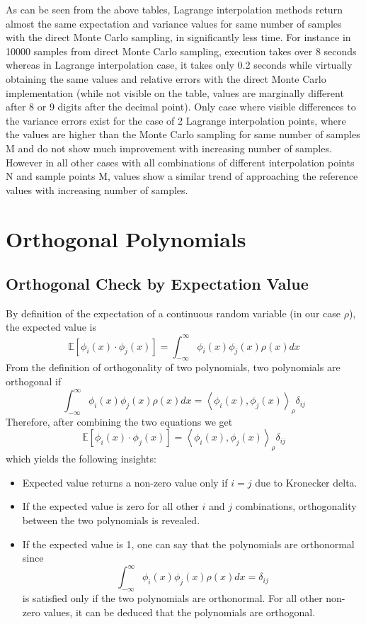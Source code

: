 \documentclass{article}
\begin{document}
As can be seen from the above tables, Lagrange interpolation methods return almost the same expectation and variance 
values for same number of samples with the direct Monte Carlo sampling, in significantly less time. For instance 
in 10000 samples from direct Monte Carlo sampling, execution takes over 8 seconds whereas in Lagrange interpolation 
case, it takes only 0.2 seconds while virtually obtaining the same values and relative errors with the direct Monte
Carlo implementation (while not visible on the table, values are marginally different after 8 or 9 digits after
the decimal point). Only case where visible differences to the variance errors exist for the case of 2 Lagrange 
interpolation points, where the values are higher than the Monte Carlo sampling for same number of samples M and 
do not show much improvement with increasing number of samples. However in all other cases with all combinations
of different interpolation points N and sample points M, values show a similar trend of approaching the reference 
values with increasing number of samples.

\section{Orthogonal Polynomials}
\subsection{Orthogonal Check by Expectation Value}
By definition of the expectation of a continuous random variable (in our case $\rho$), the expected value is 
\begin{equation}
    \mathbb{E}[\phi_i(x)\cdot\phi_j(x)] = \int_{-\infty}^\infty\phi_i(x)\phi_j(x)\rho(x)dx
\end{equation}
From the definition of orthogonality of two polynomials, two polynomials are orthogonal if 
\begin{equation}
    \int_{-\infty}^\infty\phi_i(x)\phi_j(x)\rho(x)dx = \left\langle\phi_i(x), \phi_j(x)\right\rangle _\rho\delta_{ij}
\end{equation}
Therefore, after combining the two equations we get 
\begin{equation}
    \mathbb{E}[\phi_i(x)\cdot\phi_j(x)] = \left\langle\phi_i(x), \phi_j(x)\right\rangle _\rho\delta_{ij}
\end{equation}
which yields the following insights:
\begin{itemize}
    \item Expected value returns a non-zero value only if $i=j$ due to Kronecker delta.
    \item If the expected value is zero for all other $i$ and $j$ combinations, orthogonality between the two 
    polynomials is revealed.
    \item If the expected value is 1, one can say that the polynomials are orthonormal since 
    \[\int_{-\infty}^\infty\phi_i(x)\phi_j(x)\rho(x)dx = \delta_{ij}\] is satisfied only if the two polynomials are 
    orthonormal. For all other non-zero values, it can be deduced that the polynomials are orthogonal.
\end{itemize}
\end{document}
